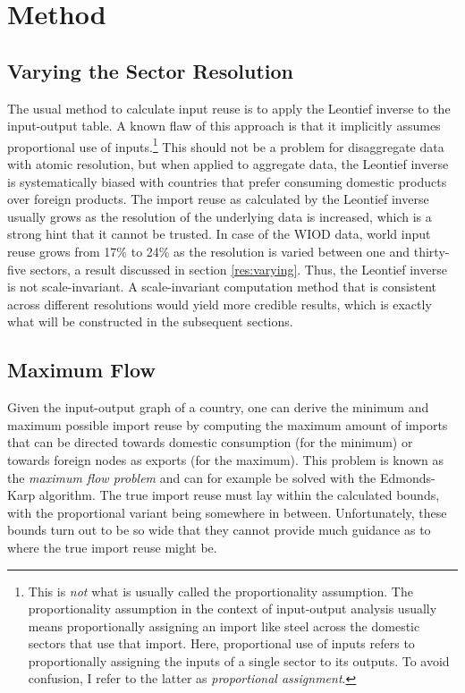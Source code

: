\documentclass{paper}
\begin{document}
\section{Method}
\label{sec:method}

\subsection{Varying the Sector Resolution}
\label{Varying}
The usual method to calculate input reuse is to apply the Leontief inverse to the input-output table. A known flaw of this approach is that it implicitly assumes proportional use of inputs.\footnote{This is \emph{not} what is usually called the proportionality assumption. The proportionality assumption in the context of input-output analysis usually means proportionally assigning an import like steel across the domestic sectors that use that import. Here, proportional use of inputs refers to proportionally assigning the inputs of a single sector to its outputs. To avoid confusion, I refer to the latter as \emph{proportional assignment}.} This should not be a problem for disaggregate data with atomic resolution, but when applied to aggregate data, the Leontief inverse is systematically biased with countries that prefer consuming domestic products over foreign products. The import reuse as calculated by the Leontief inverse usually grows as the resolution of the underlying data is increased, which is a strong hint that it cannot be trusted. In case of the WIOD data, world input reuse grows from 17\% to 24\% as the resolution is varied between one and thirty-five sectors, a result discussed in section \ref{res:varying}. Thus, the Leontief inverse is not scale-invariant. A scale-invariant computation method that is consistent across different resolutions would yield more credible results, which is exactly what will be constructed in the subsequent sections.

\subsection{Maximum Flow}
Given the input-output graph of a country, one can derive the minimum and maximum possible import reuse by computing the maximum amount of imports that can be directed towards domestic consumption (for the minimum) or towards foreign nodes as exports (for the maximum). This problem is known as the \emph{maximum flow problem} and can for example be solved with the Edmonds-Karp algorithm. \cite{edmonds1972theoretical} The true import reuse must lay within the calculated bounds, with the proportional variant being somewhere in between. Unfortunately, these bounds turn out to be so wide that they cannot provide much guidance as to where the true import reuse might be.
\end{document}
